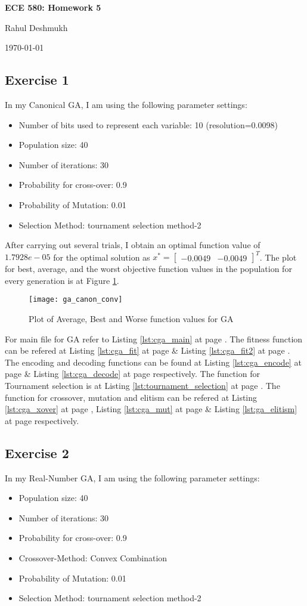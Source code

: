 \documentclass[a4paper,11pt]{article}
\newcommand{\mat}[1]{\begin{bmatrix}#1\end{bmatrix}}
\newcommand{\reflst}[1]{Listing \ref{#1} at page \pageref{#1}}
\newcommand{\reffig}[1]{Figure \ref{#1}}
\begin{document}
\begin{center}
\Large{\textbf{ECE 580: Homework 5}}

Rahul Deshmukh

\today
\end{center}

\subsection*{Exercise 1} 
In my Canonical GA, I am using the following parameter settings:
\begin{itemize}
 \item Number of bits used to represent each variable: 10 (resolution=0.0098)
 \item Population size: 40
 \item Number of iterations: 30
 \item Probability for cross-over: 0.9
 \item Probability of Mutation: 0.01
 \item Selection Method: tournament selection method-2
\end{itemize}

\noindent After carrying out several trials, I obtain an optimal function value of $1.7928e-05$ for the optimal solution as
$x^* = \mat{-0.0049&   -0.0049 }^T$. The plot for best, average, and the worst objective function values in the population for every generation is at \reffig{fig:ga_canon_conv}.

\begin{figure}[!h]
 \centering
 \texttt{[image: ga\_canon\_conv]}
 \caption{Plot of Average, Best and Worse function values for GA}
 \label{fig:ga_canon_conv}
\end{figure}

\noindent For main file for GA refer to \reflst{lst:cga_main}. The fitness function can be refered at \reflst{lst:cga_fit} \&  \reflst{lst:cga_fit2}. The encoding and decoding functions can be found at \reflst{lst:cga_encode} \& \reflst{lst:cga_decode} respectively. The function for Tournament selection is at \reflst{lst:tournament_selection}. The function for crossover, mutation and elitism can be refered at \reflst{lst:cga_xover}, \reflst{lst:cga_mut} \& \reflst{lst:ga_elitism} respectively.

%
\clearpage
\vspace{2ex}
%
\subsection*{Exercise 2} 
In my Real-Number GA, I am using the following parameter settings:
\begin{itemize}
 \item Population size: 40
 \item Number of iterations: 30
 \item Probability for cross-over: 0.9
 \item Crossover-Method: Convex Combination
 \item Probability of Mutation: 0.01
 \item Selection Method: tournament selection method-2
\end{itemize}
\end{document}
